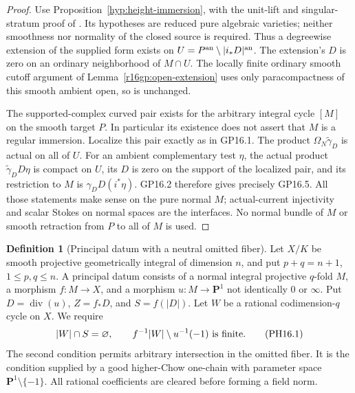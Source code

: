 \documentclass[11pt,a4paper]{article}
\theoremstyle{definition}
\newtheorem{definition}[theorem]{Definition}
\theoremstyle{remark}
\numberwithin{equation}{section}
\begin{document}
\begin{proof}
Use Proposition~\ref{hyp:height-immersion}, with the unit-lift and singular-stratum proof of \cite{Imm14}.  Its hypotheses are reduced pure
algebraic varieties; neither smoothness nor normality of the closed
source is required.  Thus a degreewise extension of the supplied form
exists on $U=P^{\rm an}\setminus|i_*D|^{\rm an}$.  The extension's
$D$ is zero on an ordinary neighborhood of $M\cap U$.  The locally
finite ordinary smooth cutoff argument of
Lemma~\ref{r16gp:open-extension} uses only paracompactness of this
smooth ambient open, so is unchanged.

The supported-complex curved pair exists for the arbitrary
integral cycle $[M]$ on the smooth target $P$.  In particular its
existence does not assert that $M$ is a regular immersion.  Localize
this pair exactly as in GP16.1.  The product
$\Omega_N\widetilde\gamma_D$ is actual on all of $U$.
For an ambient complementary test $\eta$, the actual product
$\widetilde\gamma_D D\eta$ is compact on $U$, its $D$ is zero
on the support of the localized pair, and its restriction to $M$
is $\gamma_D D(i^*\eta)$.  GP16.2 therefore gives precisely
GP16.5.  All those statements make sense on the pure normal $M$;
actual-current injectivity and scalar Stokes on normal spaces are
the interfaces.  No normal bundle of $M$ or smooth retraction
from $P$ to all of $M$ is used.
\end{proof}

\begin{definition}[Principal datum with a neutral omitted fiber]
\label{r16ph:datum}
Let $X/K$ be smooth projective geometrically integral of dimension
$n$, and put $p+q=n+1$, $1\le p,q\le n$.
A principal datum consists of a normal integral projective
$q$-fold $M$, a morphism $f:M\to X$, and a morphism
$u:M\to\mathbf P^1$ not identically $0$ or $\infty$.
Put $D=\operatorname{div}(u)$, $Z=f_*D$, and $S=f(|D|)$.
Let $W$ be a rational codimension-$q$ cycle on $X$.  We require
\[
 |W|\cap S=\varnothing,\qquad
 f^{-1}|W|\setminus u^{-1}(-1)\ \hbox{is finite}.
 \tag{PH16.1}\label{r16ph:position}
\]
The second condition permits arbitrary intersection in the omitted
fiber.  It is the condition supplied by a good higher-Chow
one-chain with parameter space $\mathbf P^1\setminus\{-1\}$.
All rational coefficients are cleared before forming a field norm.
\end{definition}
\end{document}
